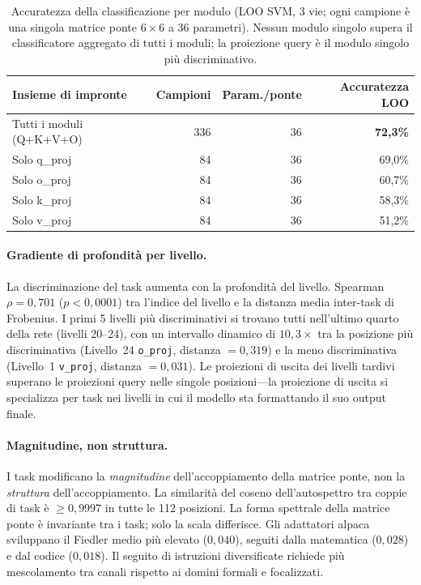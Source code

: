 \documentclass[11pt]{article}
\begin{document}
\begin{table}[t]
\centering
\caption{Accuratezza della classificazione per modulo (LOO SVM, 3 vie;
ogni campione \`e una singola matrice ponte $6 \times 6$ a 36
parametri). Nessun modulo singolo supera il classificatore aggregato
di tutti i moduli; la proiezione query \`e il modulo singolo pi\`u
discriminativo.}
\label{tab:subset-class}
\small
\begin{tabular}{@{}lrrr@{}}
\toprule
Insieme di impronte & Campioni & Param./ponte & Accuratezza LOO \\
\midrule
Tutti i moduli (Q+K+V+O) & 336 & 36 & \textbf{72,3\%} \\
Solo q\_proj & 84 & 36 & 69,0\% \\
Solo o\_proj & 84 & 36 & 60,7\% \\
Solo k\_proj & 84 & 36 & 58,3\% \\
Solo v\_proj & 84 & 36 & 51,2\% \\
\bottomrule
\end{tabular}
\end{table}

\paragraph{Gradiente di profondit\`a per livello.}
La discriminazione del task aumenta con la profondit\`a del livello.
Spearman $\rho = 0{,}701$ ($p < 0{,}0001$) tra l'indice del livello e
la distanza media inter-task di Frobenius. I primi 5 livelli pi\`u
discriminativi si trovano tutti nell'ultimo quarto della rete (livelli
20--24), con un intervallo dinamico di $10{,}3\times$ tra la posizione
pi\`u discriminativa (Livello~24 \texttt{o\_proj}, distanza $= 0{,}319$)
e la meno discriminativa (Livello~1 \texttt{v\_proj},
distanza $= 0{,}031$).
Le proiezioni di uscita dei livelli tardivi superano le proiezioni query
nelle singole posizioni---la proiezione di uscita si specializza per
task nei livelli in cui il modello sta formattando il suo output finale.

\paragraph{Magnitudine, non struttura.}
I task modificano la \emph{magnitudine} dell'accoppiamento della matrice
ponte, non la \emph{struttura} dell'accoppiamento. La similarit\`a del
coseno dell'autospettro tra coppie di task \`e $\geq 0{,}9997$ in tutte
le 112 posizioni. La forma spettrale della matrice ponte \`e invariante
tra i task; solo la scala differisce. Gli adattatori alpaca sviluppano
il Fiedler medio pi\`u elevato ($0{,}040$), seguiti dalla matematica
($0{,}028$) e dal codice ($0{,}018$). Il seguito di istruzioni
diversificate richiede pi\`u mescolamento tra canali rispetto ai domini
formali e focalizzati.
\end{document}

